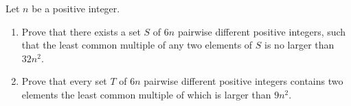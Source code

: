 Let $n$ be a positive integer.
\begin{enumerate}[label=(\alph*)]
	\item Prove that there exists a set $S$ of $6n$ pairwise different positive integers, such that the least common multiple of any two elements of $S$ is no larger than $32n^2$.
	\item Prove that every set $T$ of $6n$ pairwise different positive integers contains two elements the least common multiple of which is larger than $9n^2$.
\end{enumerate}